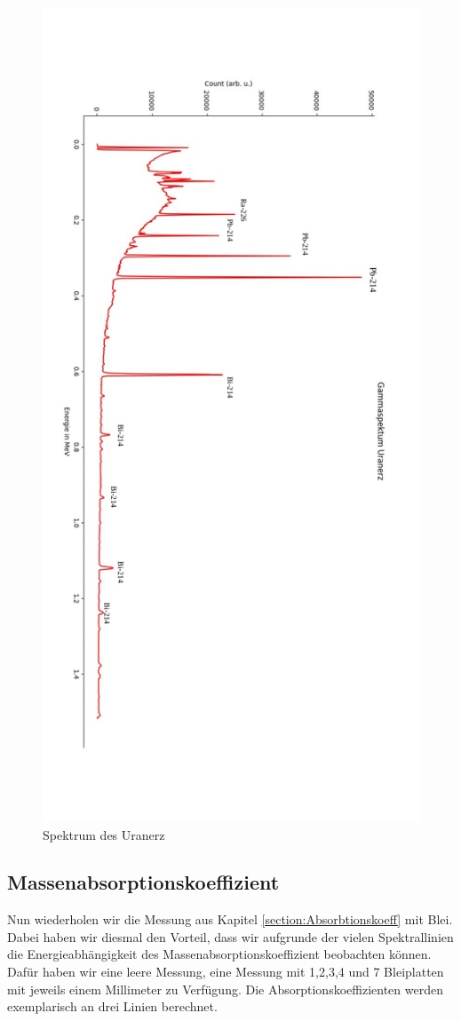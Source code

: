 \begin{figure}[h]
    \centering
    \includegraphics[width = 12cm]{Bilder/Auswertung/UranerzSpektrum.pdf}
    \caption{Spektrum des Uranerz}
    \label{Uranerz}
\end{figure}

\clearpage
\subsection{Massenabsorptionskoeffizient}

Nun wiederholen wir die Messung aus Kapitel \ref{section:Absorbtionskoeff} mit Blei. Dabei haben wir diesmal den Vorteil, dass wir aufgrunde der vielen 
Spektrallinien die Energieabhängigkeit des Massenabsorptionskoeffizient beobachten können. Dafür haben wir eine leere Messung, eine Messung mit 1,2,3,4 und 7 Bleiplatten mit 
jeweils einem Millimeter zu Verfügung. Die Absorptionskoeffizienten  werden exemplarisch an drei Linien berechnet. 